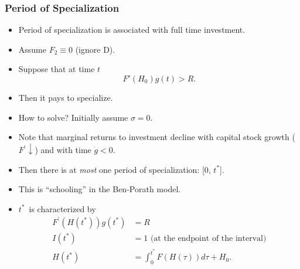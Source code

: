 \documentclass[12pt,compress,handout]{beamer}  %
\begin{document}
\begin{frame}
\frametitle{\normalsize Period of Specialization}

\begin{itemize}
\item
Period of specialization is associated with full time investment.\\[3mm]

\item
Assume $F_2\equiv 0$ (ignore D).\\[3mm]

\item
Suppose that at time $t$
\begin{equation*}
    F'(H_0)g(t)>R.
\end{equation*}

\item
Then it pays to specialize.\\[3mm]

\item
How to solve? Initially assume $\sigma =0$.\\[3mm]

\item
Note that marginal returns to investment decline with capital stock growth
($F^{\prime }\downarrow $) and with time $\dot{g}<0$.
\end{itemize}
\end{frame}


\begin{frame}

\begin{itemize}
\item
Then there is at {\itshape most} one period of specialization: [0, $t^{*}
$].\\[3mm]

\item
This is ``schooling'' in the Ben-Porath model.\\[3mm]

\item
$t^{*}$\ is characterized by
\begin{align*}
    F^{\prime }(H(t^{*}))g(t^{*}) & =R\\[3mm]
    I(t^{*}) & =1\text{ (at the endpoint of the interval)}\\[3mm]
    H(t^{*}) & =\int _0^{t^*}F\left( H(\tau )\right) d\tau +H_0\text{.}
\end{align*}
\end{itemize}

\end{frame}
\end{document}
